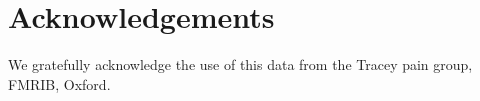 \documentclass{llncs}
\begin{document}
\section{Acknowledgements}
We gratefully acknowledge the use of this data from the Tracey pain group, FMRIB, Oxford.

%








\end{document}
